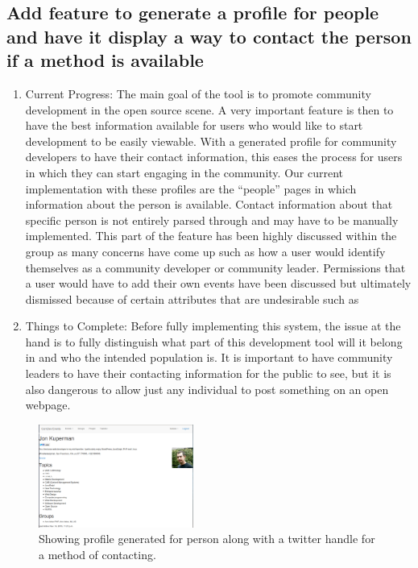 \documentclass[letterpaper,10pt,onecolumn]{IEEEtran} %
\begin{document}
\subsection{Add feature to generate a profile for people and have it display a way to contact the person if a method is available}
\begin{enumerate}[label*=\arabic*.]
\item Current Progress: The main goal of the tool is to promote community development in the open source scene. A very important feature is then to have the best information available for users who would like to start development to be easily viewable. With a generated profile for community developers to have their contact information, this eases the process for users in which they can start engaging in the community. Our current implementation with these profiles are the “people” pages in which information about the person is available. Contact information about that specific person is not entirely parsed through and may have to be manually implemented. This part of the feature has been highly discussed within the group as many concerns have come up such as how a user would identify themselves as a community developer or community leader. Permissions that a user would have to add their own events have been discussed but ultimately dismissed because of certain attributes that are undesirable such as

\item Things to Complete: Before fully implementing this system, the issue at the hand is to fully distinguish what part of this development tool will it belong in and who the intended population is. It is important to have community leaders to have their contacting information for the public to see, but it is also dangerous to allow just any individual to post something on an open webpage.
\end{enumerate}

\begin{figure}[htp]
  \begin{center}
  
  \includegraphics[width=2in]{peopleProfile}
  \centering
  \caption{Showing profile generated for person along with a twitter handle for a method of contacting. }

  \end{center}
\end{figure}
\end{document}
